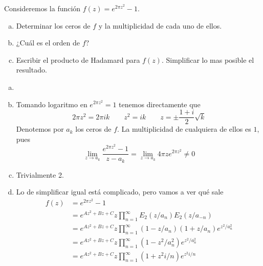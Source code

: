 \documentclass[twoside]{article}
\begin{document}
\newpage
\begin{ejercicio}{4}
Consideremos la función $f(z)=e^{2\pi z^2}-1$.
\begin{enumerate}[a)]
\item Determinar los ceros de $f$ y la multiplicidad de cada uno de ellos. 
\item ¿Cuál es el orden de $f$?
\item Escribir el producto de Hadamard para $f(z)$.  Simplificar lo mas posible el resultado. 
\end{enumerate}
\end{ejercicio}
\begin{solucion}
\begin{enumerate}[a)]
\item[]
\item Tomando logaritmo en $e^{2\pi z^2} = 1$ tenemos directamente que
$$
2\pi z^2 = 2\pi i k \qquad z^2 = ik \qquad z = \pm \frac{1+i}{2}\sqrt{k} 
$$
Denotemos por $a_k$ los ceros de $f$. La multiplicidad de cualquiera de ellos es $1$, pues
$$
\lim_{z\to a_k} \frac{e^{2\pi z^2}-1}{z-a_k} = \lim_{z\to a_k}4\pi z {e^{2\pi z^2}} \neq 0
$$
\item Trivialmente 2.
\item Lo de simplificar igual está complicado, pero vamos a ver qué sale
\begin{align*}
f(z) & = e^{2\pi z^2}-1\\
&= e^{Az^2+Bz+C}z\prod_{n=1}^\infty E_2(z/a_n)E_2(z/a_{-n})\\
&= e^{Az^2+Bz+C}z\prod_{n=1}^\infty (1-z/a_n)(1+z/a_n)e^{z^2/a_n^2}\\
&=e^{Az^2+Bz+C}z\prod_{n=1}^\infty (1-z^2/a_n^2)e^{z^2/a_n^2}\\
&=e^{Az^2+Bz+C}z\prod_{n=1}^\infty (1+z^2i/n)e^{z^2i/n}\\
\end{align*}
\end{enumerate}
\end{solucion}

\newpage
\end{document}
